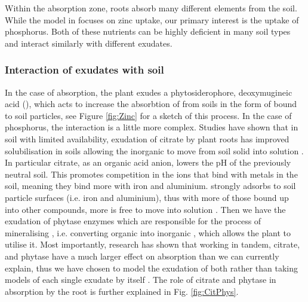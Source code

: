 \documentclass[11pt]{article}
\numberwithin{equation}{section}
\begin{document}
Within the absorption zone, roots absorb many different elements from the soil. While the model in \cite{Ptashnyk-2011} focuses on zinc uptake, our primary interest is the uptake of phosphorus. Both of these nutrients can be highly deficient in many soil types and interact similarly with different exudates.



\subsubsection{Interaction of exudates with soil}

In the case of   absorption, the plant exudes a phytosiderophore, deoxymugineic acid (), which acts to increase the absorbtion of  from soils in the form of  bound to soil particles, see Figure \ref{fig:Zinc} for a sketch of this process. In the case of phosphorus, the interaction is a little more complex. Studies have shown that in soil with limited  availability, exudation of citrate by plant roots has improved  solubilisation in soils
allowing the inorganic  to move from soil solid into solution \cite{McKayFletcher-2019}. In particular citrate, as an organic acid anion, lowers the pH of the previously neutral soil. This promotes competition in the ions that bind with metals in the soil, meaning they bind more with iron and aluminium.  strongly adsorbs to soil particle surfaces (i.e. iron and aluminium), thus with more of those bound up into other compounds, more  is free to move into solution \cite{McKayFletcher-2019}.
Then we have the exudation of phytase enzymes which are responsible for the process of mineralising , i.e. converting organic  into inorganic , which allows the plant to utilise it. Most importantly, research has shown that working in tandem, citrate, and phytase have a much larger effect on  absorption than we can currently explain, thus we have chosen to model the exudation of both rather than taking models of each single exudate by itself \cite{giles_george}. The role of citrate and phytase in  absorption by the root is further explained in Fig. \ref{fig:CitPhys}.
\end{document}
